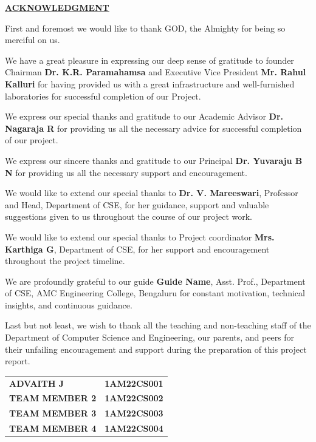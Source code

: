 \documentclass[12pt,a4paper]{report}
\begin{document}
\newpage
\begin{center}
    {\large \textbf{\underline{ACKNOWLEDGMENT}}}\\[20pt]
\end{center}

\noindent
First and foremost we would like to thank GOD, the Almighty for being so merciful on us.

\noindent
We have a great pleasure in expressing our deep sense of gratitude to founder Chairman \textbf{Dr. K.R. Paramahamsa} and Executive Vice President \textbf{Mr. Rahul Kalluri} for having provided us with a great infrastructure and well-furnished laboratories for successful completion of our Project.

\noindent
We express our special thanks and gratitude to our Academic Advisor \textbf{Dr. Nagaraja R} for providing us all the necessary advice for successful completion of our project.

\noindent
We express our sincere thanks and gratitude to our Principal \textbf{Dr. Yuvaraju B N} for providing us all the necessary support and encouragement.

\noindent
We would like to extend our special thanks to \textbf{Dr. V. Mareeswari}, Professor and Head, Department of CSE, for her guidance, support and valuable suggestions given to us throughout the course of our project work.

\noindent
We would like to extend our special thanks to Project coordinator \textbf{Mrs. Karthiga G}, Department of CSE, for her support and encouragement throughout the project timeline.

\noindent
We are profoundly grateful to our guide \textbf{Guide Name}, Asst. Prof., Department of CSE, AMC Engineering College, Bengaluru for constant motivation, technical insights, and continuous guidance.

\noindent
Last but not least, we wish to thank all the teaching and non-teaching staff of the Department of Computer Science and Engineering, our parents, and peers for their unfailing encouragement and support during the preparation of this project report.\\[30pt]

\noindent
\begin{tabularx}{\textwidth}{l X}
    \textbf{ADVAITH J} & \textbf{1AM22CS001} \\
    \textbf{TEAM MEMBER 2} & \textbf{1AM22CS002} \\
    \textbf{TEAM MEMBER 3} & \textbf{1AM22CS003} \\
    \textbf{TEAM MEMBER 4} & \textbf{1AM22CS004} \\
\end{tabularx}
\end{document}
